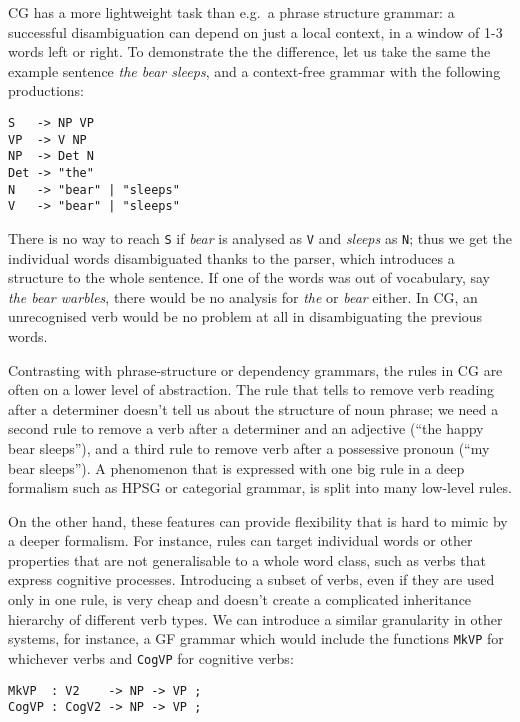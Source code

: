 
CG has a more lightweight task than e.g.~a phrase structure grammar: a
successful disambiguation can depend on just a local context, in a
window of 1-3 words left or right. To demonstrate the the difference,
let us take the same the example sentence \emph{the bear sleeps}, and a
context-free grammar with the following productions:


\begin{verbatim}
S   -> NP VP
VP  -> V NP
NP  -> Det N
Det -> "the"
N   -> "bear" | "sleeps"
V   -> "bear" | "sleeps"
\end{verbatim}

There is no way to reach \texttt{S} if \emph{bear} is analysed as
\texttt{V} and \emph{sleeps} as \texttt{N}; thus we get the individual
words disambiguated thanks to the parser, which introduces a structure
to the whole sentence. If one of the words was out of vocabulary, say
\emph{the bear warbles}, there would be no analysis for \emph{the} or
\emph{bear} either. In CG, an unrecognised verb would be no problem at
all in disambiguating the previous words.


Contrasting with phrase-structure or dependency grammars, the rules in
CG are often on a lower level of abstraction. 
The rule that tells to remove verb reading after a determiner
doesn't tell us about the structure of noun phrase; we need a second
rule to remove a verb after a determiner and an adjective (``the happy
bear sleeps''), and a third rule to remove verb after a possessive
pronoun (``my bear sleeps''). A phenomenon that is expressed with one
big rule in a deep formalism such as HPSG or categorial grammar, is
split into many low-level rules.

On the other hand, these features can provide
flexibility that is hard to mimic by a deeper formalism.
For instance, rules can target individual words
or other properties that are not generalisable to a whole word class,
such as verbs that express cognitive processes.
Introducing a subset of verbs, even if they are used only in one rule,
is very cheap and doesn't create a complicated inheritance hierarchy
of different verb types.
We can introduce a similar granularity in other systems, for instance,
a GF grammar which would include the functions \texttt{MkVP} for
whichever verbs and \texttt{CogVP} for cognitive verbs:


\begin{verbatim}
MkVP  : V2    -> NP -> VP ;
CogVP : CogV2 -> NP -> VP ;
\end{verbatim}

